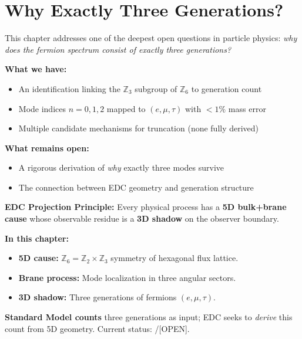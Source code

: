 
\section{Why Exactly Three Generations?}
\label{sec:ch5_three_generations}

\begin{tcolorbox}[edcGuardrail, title=\textbf{Epistemic Status: HIGH RISK}]
This chapter addresses one of the deepest open questions in particle physics:
\emph{why does the fermion spectrum consist of exactly three generations?}

\textbf{What we have:}
\begin{itemize}[nosep]
    \item An identification linking the $\mathbb{Z}_3$ subgroup of $\mathbb{Z}_6$ to
          generation count \tagI{}
    \item Mode indices $n = 0, 1, 2$ mapped to $(e, \mu, \tau)$ with $<1\%$ mass
          error \tagI{}
    \item Multiple candidate mechanisms for truncation (none fully derived)
\end{itemize}

\textbf{What remains open:}
\begin{itemize}[nosep]
    \item A rigorous derivation of \emph{why} exactly three modes survive
    \item The connection between EDC geometry and generation structure
\end{itemize}
\end{tcolorbox}

\begin{tcolorbox}[colback=blue!3!white, colframe=blue!50!black,
    title=\textbf{Framework 2.0 Language Compliance}]
\small
\textbf{EDC Projection Principle:} Every physical process has a \textbf{5D bulk+brane cause}
whose observable residue is a \textbf{3D shadow} on the observer boundary.

\textbf{In this chapter:}
\begin{itemize}[nosep]
    \item \textbf{5D cause:} $\mathbb{Z}_6 = \mathbb{Z}_2 \times \mathbb{Z}_3$ symmetry of hexagonal flux lattice.
    \item \textbf{Brane process:} Mode localization in three angular sectors.
    \item \textbf{3D shadow:} Three generations of fermions $(e, \mu, \tau)$.
\end{itemize}

\textbf{Standard Model counts} three generations as input; EDC seeks to \emph{derive}
this count from 5D geometry. Current status: \tagI{}/[OPEN].
\end{tcolorbox}


